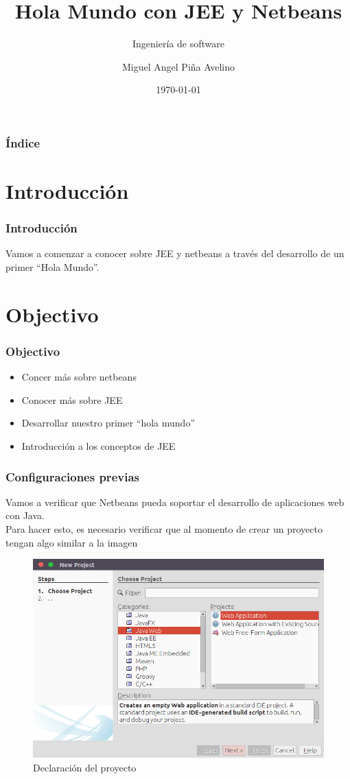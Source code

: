 \documentclass{beamer}
\title[UNAM]{Hola Mundo con JEE y Netbeans}
\subtitle{Ingeniería de software}
\author[Miguel]{Miguel Angel Piña Avelino}
\institute[UNAM]{
  Facultad de Ciencias, UNAM
}
\date{\today}
\begin{document}
\frame{\titlepage}

\begin{frame}
  \frametitle{Índice}
  \tableofcontents
\end{frame}

\section{Introducción}
\begin{frame}
  \frametitle{Introducción}
  Vamos a comenzar a conocer sobre JEE y netbeans a través del desarrollo de un
  primer ``Hola Mundo''.
\end{frame}

\section{Objectivo}

\begin{frame}
  \frametitle{Objectivo}
  \begin{itemize}
    \item Concer más sobre netbeans
    \item Conocer más sobre JEE
    \item Desarrollar nuestro primer ``hola mundo''
    \item Introducción a los conceptos de JEE
  \end{itemize}
\end{frame}

\begin{frame}
  \frametitle{Configuraciones previas}
  Vamos a verificar que Netbeans pueda soportar el desarrollo de aplicaciones
  web con Java.\\
  Para hacer esto, es necesario verificar que al momento de crear un proyecto
  tengan algo similar a la imagen
  \begin{figure}[ht]
    \centering
    \includegraphics[scale=0.25]{figures/proyecto.png}
    \caption{\label{fig:Proyecto} Declaración del proyecto }
  \end{figure}

\end{frame}
\end{document}
